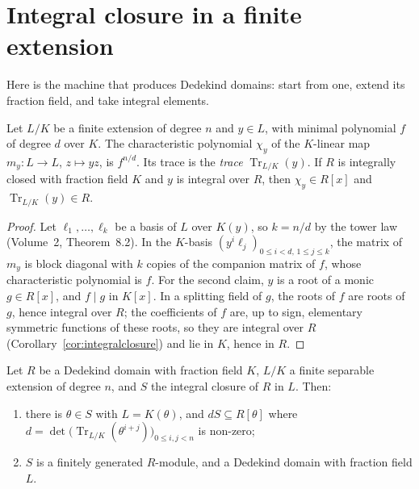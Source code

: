 \section{Integral closure in a finite extension}

Here is the machine that produces Dedekind domains: start from one, extend its fraction field, and take integral elements.

\begin{lemma}\label{lem:trace}
Let $L/K$ be a finite extension of degree $n$ and $y\in L$, with minimal polynomial $f$ of degree $d$ over $K$. The characteristic polynomial $\chi_y$ of the $K$-linear map $m_y\colon L\to L$, $z\mapsto yz$, is $f^{n/d}$. Its trace
is the \emph{trace} $\operatorname{Tr}_{L/K}(y)$. If $R$ is integrally closed with fraction field $K$ and $y$ is integral over $R$, then $\chi_y\in R[x]$ and $\operatorname{Tr}_{L/K}(y)\in R$.
\end{lemma}

\begin{proof}
Let $\ell_1,\dots,\ell_k$ be a basis of $L$ over $K(y)$, so $k=n/d$ by the tower law (Volume~2, Theorem~8.2). In the $K$-basis $(y^i\ell_j)_{0\le i<d,\,1\le j\le k}$, the matrix of $m_y$ is block diagonal with $k$ copies of the
companion matrix of $f$, whose characteristic polynomial is $f$. For the second claim, $y$ is a root of a monic $g\in R[x]$, and $f\mid g$ in $K[x]$. In a splitting field of $g$, the roots of $f$ are roots of $g$, hence integral
over $R$; the coefficients of $f$ are, up to sign, elementary symmetric functions of these roots, so they are integral over $R$ (Corollary~\ref{cor:integralclosure}) and lie in $K$, hence in $R$.
\end{proof}

\begin{theorem}\label{thm:intclosure}
Let $R$ be a Dedekind domain with fraction field $K$, $L/K$ a finite separable extension of degree $n$, and $S$ the integral closure of $R$ in $L$. Then:
\begin{enumerate}[label=(\alph*)]
\item there is $\theta\in S$ with $L=K(\theta)$, and $dS\subseteq R[\theta]$ where $d=\det\bigl(\operatorname{Tr}_{L/K}(\theta^{i+j})\bigr)_{0\le i,j<n}$ is non-zero;
\item $S$ is a finitely generated $R$-module, and a Dedekind domain with fraction field $L$.
\end{enumerate}
\end{theorem}

